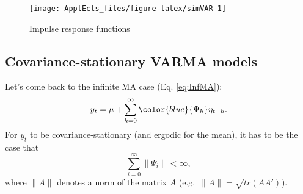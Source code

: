 \documentclass[
  12pt,
]{book}
\newenvironment{Shaded}{\begin{snugshade}}{\end{snugshade}}
\newcommand{\AttributeTok}[1]{\textcolor[rgb]{0.77,0.63,0.00}{#1}}
\newcommand{\DecValTok}[1]{\textcolor[rgb]{0.00,0.00,0.81}{#1}}
\newcommand{\FloatTok}[1]{\textcolor[rgb]{0.00,0.00,0.81}{#1}}
\newcommand{\FunctionTok}[1]{\textcolor[rgb]{0.00,0.00,0.00}{#1}}
\newcommand{\NormalTok}[1]{#1}
\newcommand{\SpecialCharTok}[1]{\textcolor[rgb]{0.00,0.00,0.00}{#1}}
\newcommand{\StringTok}[1]{\textcolor[rgb]{0.31,0.60,0.02}{#1}}
\theoremstyle{definition}
\theoremstyle{definition}
\theoremstyle{definition}
\theoremstyle{definition}
\theoremstyle{remark}
\begin{document}
\begin{Shaded}
\end{Shaded}

\begin{figure}
\texttt{[image: ApplEcts\_files/figure-latex/simVAR-1]} \caption{Impulse response functions}\label{fig:simVAR}
\end{figure}

\hypertarget{covariance-stationary-varma-models}{%
\subsection{Covariance-stationary VARMA models}\label{covariance-stationary-varma-models}}

Let's come back to the infinite MA case (Eq. \eqref{eq:InfMA}):
\[
y_t = \mu + \sum_{h=0}^\infty \color{blue}{\Psi_{h}} \eta_{t-h}.
\]
For \(y_t\) to be covariance-stationary (and ergodic for the mean), it has to be the case that
\begin{equation}
\sum_{i=0}^\infty \|\Psi_i\| < \infty,\label{eq:condiInfiniteMA}
\end{equation}
where \(\|A\|\) denotes a norm of the matrix \(A\) (e.g.~\(\|A\|=\sqrt{tr(AA')}\)).
\end{document}
